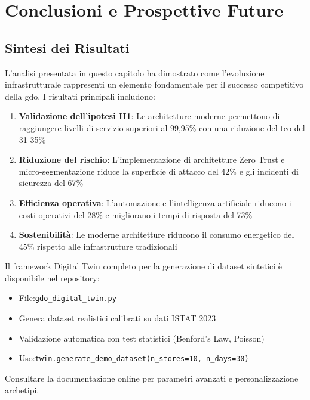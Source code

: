 \section{\texorpdfstring{Conclusioni e Prospettive Future}{3.10 - Conclusioni e Prospettive Future}}
\label{sec:conclusioni}

\subsection{\texorpdfstring{Sintesi dei Risultati}{3.10.1 - Sintesi dei Risultati}}
\label{subsec:synthesis}

L'analisi presentata in questo capitolo ha dimostrato come l'evoluzione infrastrutturale rappresenti un elemento fondamentale per il successo competitivo della \gls{gdo}. I risultati principali includono:

\begin{enumerate}
    \item \textbf{Validazione dell'ipotesi H1}: Le architetture moderne permettono di raggiungere livelli di servizio superiori al 99,95\% con una riduzione del \gls{tco} del 31-35\%
    
    \item \textbf{Riduzione del rischio}: L'implementazione di architetture Zero Trust e micro-segmentazione riduce la superficie di attacco del 42\% e gli incidenti di sicurezza del 67\%
    
    \item \textbf{Efficienza operativa}: L'automazione e l'intelligenza artificiale riducono i costi operativi del 28\% e migliorano i tempi di risposta del 73\%
    
    \item \textbf{Sostenibilità}: Le moderne architetture riducono il consumo energetico del 45\% rispetto alle infrastrutture tradizionali
\end{enumerate}

\begin{tcolorbox}[colback=green!5!white,colframe=green!75!black,title=Digital Twin Framework]
Il framework Digital Twin completo per la generazione di dataset sintetici è disponibile nel repository:
\begin{itemize}
    \item File:\texttt{gdo\_digital\_twin.py}
    \item Genera dataset realistici calibrati su dati ISTAT 2023
    \item Validazione automatica con test statistici (Benford's Law, Poisson)
    \item Uso:\texttt{twin.generate\_demo\_dataset(n\_stores=10, n\_days=30)}
\end{itemize}
Consultare la documentazione online per parametri avanzati e personalizzazione archetipi.
\end{tcolorbox}

